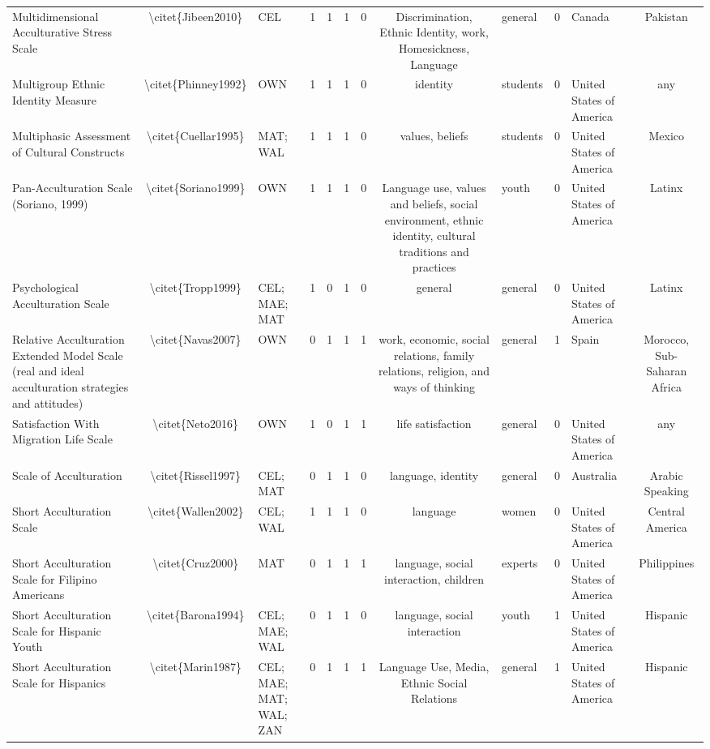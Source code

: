 \begin{longtable}[l]{lclclclclclc}
Multidimensional Acculturative Stress Scale & \textbackslash{}citet\{Jibeen2010\} & CEL & 1 & 1 & 1 & 0 & Discrimination, Ethnic Identity, work,  Homesickness, Language & general & 0 & Canada & Pakistan\\
Multigroup Ethnic Identity Measure & \textbackslash{}citet\{Phinney1992\} & OWN & 1 & 1 & 1 & 0 & identity & students & 0 & United States of America & any\\
Multiphasic Assessment of Cultural Constructs & \textbackslash{}citet\{Cuellar1995\} & MAT; WAL & 1 & 1 & 1 & 0 & values, beliefs & students & 0 & United States of America & Mexico\\
Pan-Acculturation Scale (Soriano, 1999) & \textbackslash{}citet\{Soriano1999\} & OWN & 1 & 1 & 1 & 0 & Language use, values and beliefs, social environment, ethnic identity, cultural traditions and practices & youth & 0 & United States of America & Latinx\\
Psychological Acculturation Scale & \textbackslash{}citet\{Tropp1999\} & CEL; MAE; MAT & 1 & 0 & 1 & 0 & general & general & 0 & United States of America & Latinx\\
Relative Acculturation Extended Model Scale (real and ideal acculturation strategies and attitudes) & \textbackslash{}citet\{Navas2007\} & OWN & 0 & 1 & 1 & 1 & work, economic, social relations, family relations, religion, and ways of thinking & general & 1 & Spain & Morocco, Sub-Saharan Africa\\
Satisfaction With Migration Life Scale & \textbackslash{}citet\{Neto2016\} & OWN & 1 & 0 & 1 & 1 & life satisfaction & general & 0 & United States of America & any\\
Scale of Acculturation & \textbackslash{}citet\{Rissel1997\} & CEL; MAT & 0 & 1 & 1 & 0 & language, identity & general & 0 & Australia & Arabic Speaking\\
Short Acculturation Scale & \textbackslash{}citet\{Wallen2002\} & CEL; WAL & 1 & 1 & 1 & 0 & language & women & 0 & United States of America & Central America\\
Short Acculturation Scale for Filipino Americans & \textbackslash{}citet\{Cruz2000\} & MAT & 0 & 1 & 1 & 1 & language, social interaction, children & experts & 0 & United States of America & Philippines\\
Short Acculturation Scale for Hispanic Youth & \textbackslash{}citet\{Barona1994\} & CEL; MAE; WAL & 0 & 1 & 1 & 0 & language, social interaction & youth & 1 & United States of America & Hispanic\\
Short Acculturation Scale for Hispanics & \textbackslash{}citet\{Marin1987\} & CEL; MAE; MAT; WAL; ZAN & 0 & 1 & 1 & 1 & Language Use, Media, Ethnic Social Relations & general & 1 & United States of America & Hispanic\\

\end{longtable}

